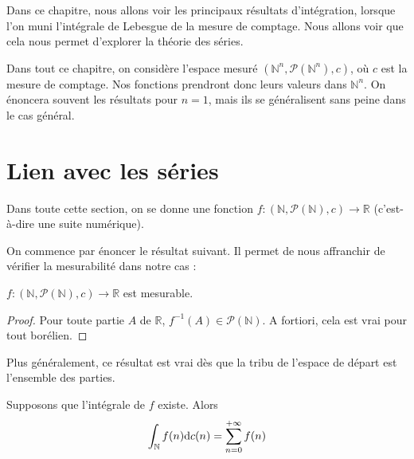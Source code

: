 \documentclass[../integ-proba.tex]{subfiles}
\begin{document}
Dans ce chapitre, nous allons voir les principaux résultats d'intégration, lorsque l'on muni l'intégrale de Lebesgue de la mesure de comptage.
Nous allons voir que cela nous permet d'explorer la théorie des séries.

Dans tout ce chapitre, on considère l'espace mesuré $\left(\mathbb{N}^n, \mathcal{P}(\mathbb{N}^n), c\right)$, où $c$ est la mesure de comptage.
Nos fonctions prendront donc leurs valeurs dans $\mathbb{N}^n$.
On énoncera souvent les résultats pour $n=1$, mais ils se généralisent sans peine dans le cas général.

\section{Lien avec les séries}

Dans toute cette section, on se donne une fonction $f:\left(\mathbb{N}, \mathcal{P}(\mathbb{N}), c\right) \rightarrow \mathbb{R}$ (c'est-à-dire une suite numérique).

On commence par énoncer le résultat suivant. Il permet de nous affranchir de vérifier la mesurabilité dans notre cas :

\begin{prop}
    $f:\left(\mathbb{N}, \mathcal{P}(\mathbb{N}), c\right) \rightarrow \mathbb{R}$ est mesurable.
\end{prop}

\begin{proof}
    Pour toute partie $A$ de $\mathbb{R}$, $f^{-1}\left(A\right) \in \mathcal{P}\left(\mathbb{N}\right)$.
    A fortiori, cela est vrai pour tout borélien.
\end{proof}

\begin{rem}
    Plus généralement, ce résultat est vrai dès que la tribu de l'espace de départ est l'ensemble des parties.
\end{rem}

\begin{thm}
    Supposons que l'intégrale de $f$ existe.
    Alors
    $$
    \int_\mathbb{N} f(n)\textnormal{d}c(n) = \sum_{n=0}^{+\infty} f(n)
    $$
\end{thm}
\end{document}

